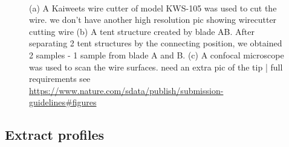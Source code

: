 \documentclass[fleqn,10pt]{wlscirep}
\newcommand{\tom}[1]{{\textcolor{RedOrange}{#1}}}
\begin{document}
\begin{figure}
\begin{minipage}{0.30\linewidth}
\subcaption{\label{fig-cut-tent-scan-c}}

\end{minipage}%
%
\begin{minipage}{0.05\linewidth}
~\end{minipage}%
%
\begin{minipage}{0.65\linewidth}


\subcaption{\label{fig-cut-tent-scan-b}}

\end{minipage}%

\caption{\label{fig-cut-tent-scan}(a) A Kaiweets wire cutter of model
KWS-105 was used to cut the wire.
\tom{we don't have another high resolution pic showing wirecutter cutting wire}
(b) A tent structure created by blade AB. After separating 2 tent
structures by the connecting position, we obtained 2 samples - 1 sample
from blade A and B. (c) A confocal microscope was used to scan the wire
surfaces. \tom{need an extra pic of the tip}
\tom{| full requirements see \href{https://www.nature.com/sdata/publish/submission-guidelines\#figures}{https://www.nature.com/sdata/publish/submission-guidelines\#figures}}}

\end{figure}%

\subsection*{Extract profiles}\label{sec-extract-profiles}
\end{document}
